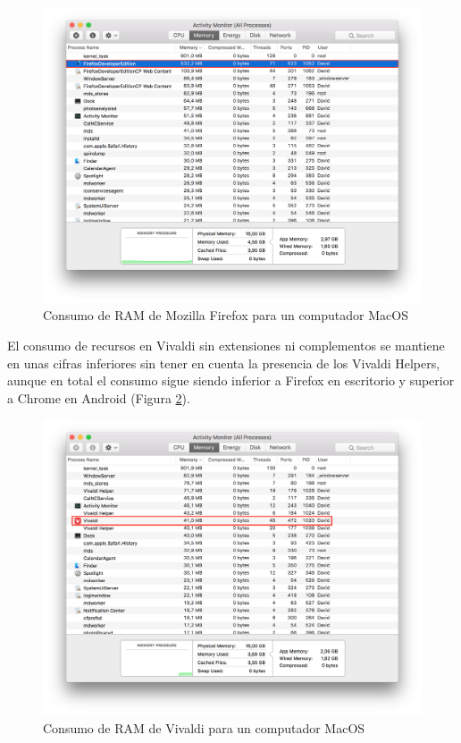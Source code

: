 \begin{figure}[!t]
\begin{center}
\includegraphics[width=0.75\linewidth]{./6_EvalEmpirica/Img/firefoxRAM.png}
\end{center}
\caption{Consumo de RAM de Mozilla Firefox para un computador MacOS}
\label{firefoxRAM}
\end{figure}

El consumo de recursos en Vivaldi sin extensiones ni complementos se mantiene en unas cifras inferiores sin tener en cuenta la presencia de los Vivaldi Helpers, aunque en total el consumo sigue siendo inferior a Firefox en escritorio y superior a Chrome en Android (Figura \ref{vivaldiRAM}).

\begin{figure}[!t]
\begin{center}
\includegraphics[width=0.75\linewidth]{./6_EvalEmpirica/Img/vivaldiRAM.png}
\end{center}
\caption{Consumo de RAM de Vivaldi para un computador MacOS}
\label{vivaldiRAM}
\end{figure}

